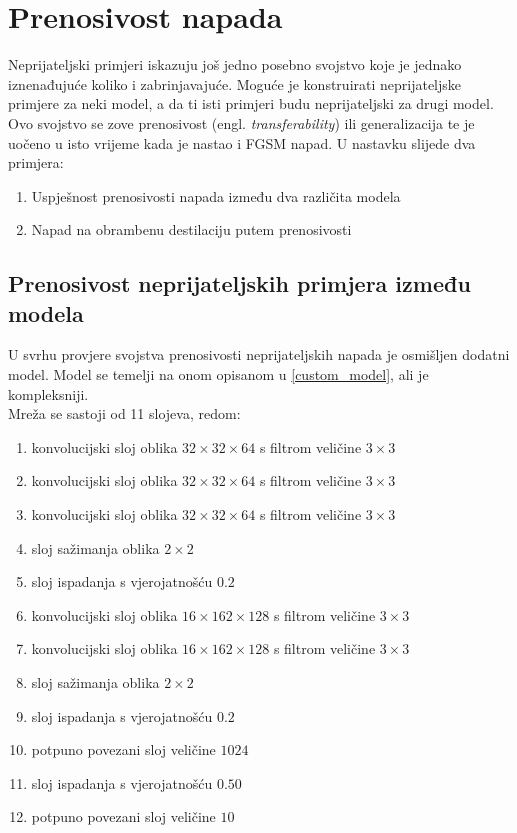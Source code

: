 \documentclass[utf8, diplomski]{fer}
\begin{document}
\section{Prenosivost napada}
Neprijateljski primjeri iskazuju još jedno posebno svojstvo koje je jednako iznenađujuće koliko i zabrinjavajuće. Moguće je konstruirati neprijateljske primjere za neki model, a da ti isti primjeri budu neprijateljski za drugi model. Ovo svojstvo se zove prenosivost (engl. \textit{transferability}) ili generalizacija te je uočeno u isto vrijeme kada je nastao i FGSM napad\citep{Goodfellow2015ExplainingAH}. U nastavku slijede dva primjera: 
\begin{enumerate}[noitemsep, label=\textbullet]
\item Uspješnost prenosivosti napada između dva različita modela
\item Napad na obrambenu destilaciju putem prenosivosti
\end{enumerate}
\subsection{Prenosivost neprijateljskih primjera između modela}\label{model_transferability}
U svrhu provjere svojstva prenosivosti neprijateljskih napada je osmišljen dodatni model. Model se temelji na onom opisanom u \ref{custom_model}, ali je kompleksniji. \\
Mreža se sastoji od 11 slojeva, redom:
\begin{enumerate}[noitemsep, label=\textbullet]
  \item konvolucijski sloj oblika $32\times32\times64$ s filtrom veličine $3\times3$
  \item konvolucijski sloj oblika $32\times32\times64$ s filtrom veličine $3\times3$
  \item konvolucijski sloj oblika $32\times32\times64$ s filtrom veličine $3\times3$
  \item sloj sažimanja oblika $2\times2$
  \item sloj ispadanja s vjerojatnošću $0.2$
  \item konvolucijski sloj oblika $16\times162\times128$ s filtrom veličine $3\times3$
  \item konvolucijski sloj oblika $16\times162\times128$ s filtrom veličine $3\times3$
  \item sloj sažimanja oblika $2\times2$
  \item sloj ispadanja s vjerojatnošću $0.2$
  \item potpuno povezani sloj veličine $1024$
  \item sloj ispadanja s vjerojatnošću $0.50$
  \item potpuno povezani sloj veličine $10$
\end{enumerate}
\end{document}
